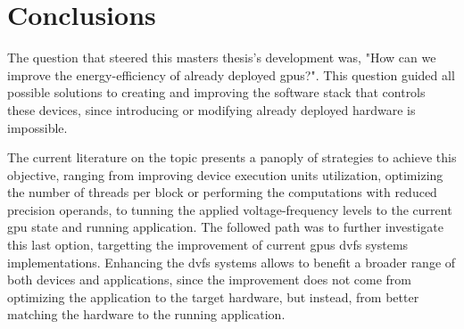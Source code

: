 
\chapter{Conclusions}
\label{chapter:conclusions}

The question that steered this masters thesis's development was, "How can we improve the energy-efficiency of already deployed \acrshort{gpu}s?". This question guided all possible solutions to creating and improving the software stack that controls these devices, since introducing or modifying already deployed hardware is impossible.

The current literature on the topic presents a panoply of strategies to achieve this objective, ranging from improving device execution units utilization, optimizing the number of threads per block or performing the computations with reduced precision operands, to tunning the applied voltage-frequency levels to the current \acrshort{gpu} state and running application. The followed path was to further investigate this last option, targetting the improvement of current \acrshort{gpu}s \acrshort{dvfs} systems implementations. Enhancing the \acrshort{dvfs} systems allows to benefit a broader range of both devices and applications, since the improvement does not come from optimizing the application to the target hardware, but instead, from better matching the hardware to the running application.

